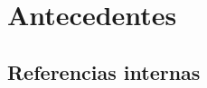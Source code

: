 \documentclass[11pt,letterpaper,titlepage]{article}
\begin{document}

\section{Antecedentes}
\subsection{Referencias internas}
\end{document}
